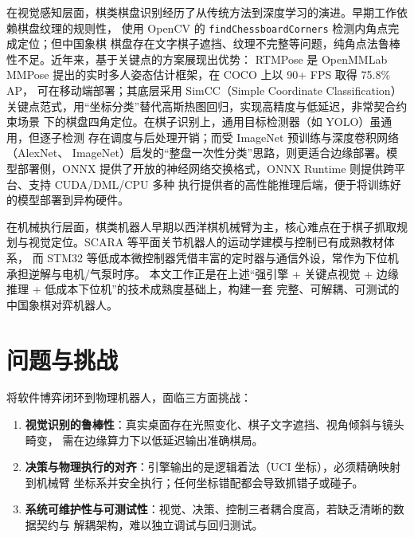 \documentclass[UTF8, a4paper, 11pt, openany]{ctexbook}
\renewcommand{\_}{\textunderscore\allowbreak}
\begin{document}
在视觉感知层面，棋类棋盘识别经历了从传统方法到深度学习的演进。早期工作依赖棋盘纹理的规则性，
使用 OpenCV 的 \texttt{findChessboardCorners} 检测内角点完成定位\cite{bradski2000opencv}；但中国象棋
棋盘存在文字棋子遮挡、纹理不完整等问题，纯角点法鲁棒性不足。近年来，基于关键点的方案展现出优势：
RTMPose 是 OpenMMLab MMPose 提出的实时多人姿态估计框架，在 COCO 上以 90+ FPS 取得 75.8\% AP，
可在移动端部署\cite{jiang2023rtmpose,mmpose2023}；其底层采用 SimCC（Simple Coordinate Classification）
关键点范式，用“坐标分类”替代高斯热图回归，实现高精度与低延迟\cite{li2022simcc}，非常契合约束场景
下的棋盘四角定位。在棋子识别上，通用目标检测器（如 YOLO\cite{redmon2016yolo}）虽通用，但逐子检测
存在调度与后处理开销；而受 ImageNet 预训练与深度卷积网络（AlexNet\cite{krizhevsky2012alexnet}、
ImageNet\cite{deng2009imagenet}）启发的“整盘一次性分类”思路，则更适合边缘部署。模型部署侧，ONNX
提供了开放的神经网络交换格式\cite{onnx2019}，ONNX Runtime 则提供跨平台、支持 CUDA/DML/CPU 多种
执行提供者的高性能推理后端\cite{onnxruntime2024}，便于将训练好的模型部署到异构硬件。

在机械执行层面，棋类机器人早期以西洋棋机械臂为主，核心难点在于棋子抓取规划与视觉定位。SCARA
等平面关节机器人的运动学建模与控制已有成熟教材体系\cite{craig2017robotics,siciliano2016handbook}，
而 STM32 等低成本微控制器凭借丰富的定时器与通信外设，常作为下位机承担逆解与电机/气泵时序\cite{stm32f103}。
本文工作正是在上述“强引擎 + 关键点视觉 + 边缘推理 + 低成本下位机”的技术成熟度基础上，构建一套
完整、可解耦、可测试的中国象棋对弈机器人。

\section{问题与挑战}
将软件博弈闭环到物理机器人，面临三方面挑战：
\begin{enumerate}[label=(\arabic*)]
  \item \textbf{视觉识别的鲁棒性}：真实桌面存在光照变化、棋子文字遮挡、视角倾斜与镜头畸变，
        需在边缘算力下以低延迟输出准确棋局。
  \item \textbf{决策与物理执行的对齐}：引擎输出的是逻辑着法（UCI 坐标），必须精确映射到机械臂
        坐标系并安全执行；任何坐标错配都会导致抓错子或碰子。
  \item \textbf{系统可维护性与可测试性}：视觉、决策、控制三者耦合度高，若缺乏清晰的数据契约与
        解耦架构，难以独立调试与回归测试。
\end{enumerate}
\end{document}
